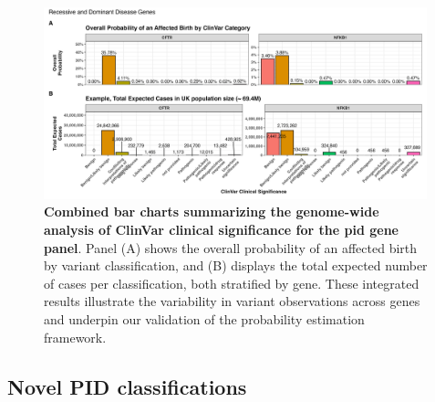 \begin{figure}[ht]
  \centering
  \includegraphics[width=0.99\textwidth]{../images/all_genes_combined_bar_charts_mini.png}
  \caption{\textbf{Combined bar charts summarizing the genome-wide analysis of ClinVar clinical significance for the \ac{pid} gene panel}. Panel (A) shows the overall probability of an affected birth by variant classification, and (B) displays the total expected number of cases per classification, both stratified by gene. These integrated results illustrate the variability in variant observations across genes and underpin our validation of the probability estimation framework.}
  \label{fig:all_genes_combined_bar_charts_mini}
\end{figure}


\FloatBarrier
\subsection{Novel PID classifications}



